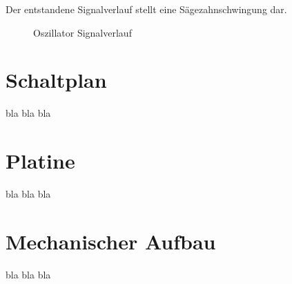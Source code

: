 Der entstandene Signalverlauf stellt eine  Sägezahnschwingung dar.

\begin{figure}[htbp]
	\centering
	\setlength{\fboxsep}{1pt} %
	\setlength{\fboxrule}{1pt} %
	\caption{Oszillator Signalverlauf}
	\label{fig:fig:Oszillator_Signalverlauf}
\end{figure}

\section{Schaltplan}
bla bla bla

\section{Platine}
bla bla bla

\section{Mechanischer Aufbau}
bla bla bla